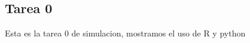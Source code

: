 \documentclass[10pt,a4paper]{article}
\begin{document}
	\begin{flushleft}
	\section{Tarea 0}
	 Esta es la tarea 0 de simulacion, mostramos el uso de R y python
	 
	
	\end{flushleft}
\end{document}
